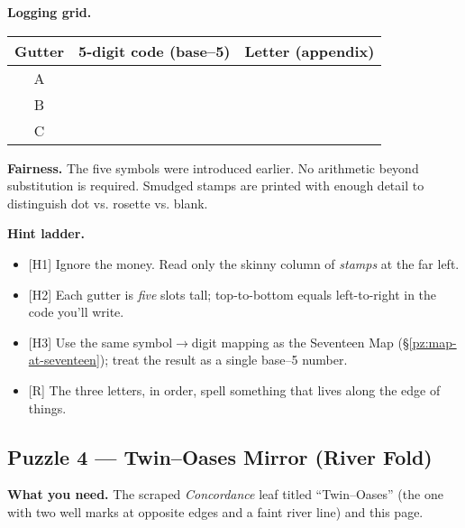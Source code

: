 \documentclass[11pt]{article}
\begin{document}
\begin{itemize}
\medskip
\noindent\textbf{Logging grid.}
\begin{center}
\begin{tabular}{c|c|c}
\textbf{Gutter} & \textbf{5-digit code (base–5)} & \textbf{Letter (appendix)} \\
\hline
A & \hspace{3.5cm} & \hspace{1.2cm} \\
B & \hspace{3.5cm} & \hspace{1.2cm} \\
C & \hspace{3.5cm} & \hspace{1.2cm} \\
\end{tabular}
\end{center}

\medskip
\noindent\textbf{Fairness.} The five symbols were introduced earlier. No arithmetic beyond substitution is required. Smudged stamps are printed with enough detail to distinguish dot vs. rosette vs. blank.

\medskip
\noindent\textbf{Hint ladder.}
\begin{itemize}\setlength\itemsep{0.25em}
  \item \textsc{[H1]} Ignore the money. Read only the skinny column of \emph{stamps} at the far left.
  \item \textsc{[H2]} Each gutter is \emph{five} slots tall; top-to-bottom equals left-to-right in the code you’ll write.
  \item \textsc{[H3]} Use the same symbol\(\rightarrow\)digit mapping as the Seventeen Map (\S\ref{pz:map-at-seventeen}); treat the result as a single base–5 number.
  \item \textsc{[R]} The three letters, in order, spell something that lives along the edge of things.
\end{itemize}

\subsection{Puzzle 4 — Twin–Oases Mirror (River Fold)}
\label{pz:twin-oases}
{}

\noindent\textbf{What you need.} The scraped \emph{Concordance} leaf titled “Twin–Oases” (the one with two well marks at opposite edges and a faint river line) and this page.


\end{itemize}
\end{document}
